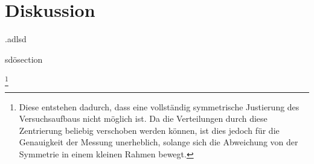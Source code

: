 \section{Diskussion}
\label{sec:Diskussion}



.adlsd


sdösection

\footnote{Diese entstehen dadurch, dass eine vollständig symmetrische Justierung
des Versuchsaufbaus nicht möglich ist. Da die Verteilungen durch diese Zentrierung
beliebig verschoben werden können, ist dies jedoch für die Genauigkeit der Messung
unerheblich, solange sich die Abweichung von der Symmetrie in einem kleinen Rahmen bewegt.}

